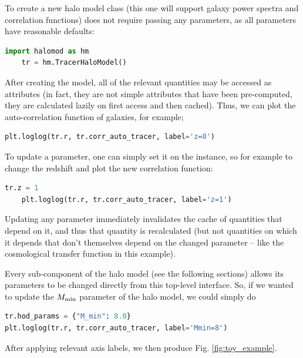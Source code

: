 \documentclass[5p,aas_macros]{elsarticle}
\begin{document}
To create a new halo model class (this one will support galaxy power spectra and correlation functions) does not require passing any parameters, as all parameters have reasonable defaults:
	\begin{lstlisting}[language=Python]
	import halomod as hm
	tr = hm.TracerHaloModel()
	\end{lstlisting}
After creating the model, all of the relevant quantities may be accessed as attributes (in fact, they are not simple attributes that have been pre-computed, they are calculated lazily on first access and then cached).
Thus, we can plot the auto-correlation function of galaxies, for example; 
\begin{lstlisting}[language=Python]
plt.loglog(tr.r, tr.corr_auto_tracer, label='z=0')
\end{lstlisting}
To update a parameter, one can simply set it on the instance, so for example to change the redshift and plot the new correlation function:
%
\begin{lstlisting}[language=Python]
	tr.z = 1
	plt.loglog(tr.r, tr.corr_auto_tracer, label='z=1')
\end{lstlisting}
Updating any parameter immediately invalidates the cache of quantities that depend on it, and thus that quantity is recalculated (but not quantities on which it depends that don't themselves depend on the changed parameter -- like the cosmological transfer function in this example). 

Every sub-component of the halo model (see the following sections) allows its parameters to be changed directly from this top-level interface. So, if we wanted to update the $M_{\rm min}$ parameter of the halo model, we could simply do
%
\begin{lstlisting}[language=Python]
tr.hod_params = {"M_min": 8.0}
plt.loglog(tr.r, tr.corr_auto_tracer, label='Mmin=8')
\end{lstlisting}
After applying relevant axis labels, we then produce Fig. \ref{fig:toy_example}.
\end{document}
